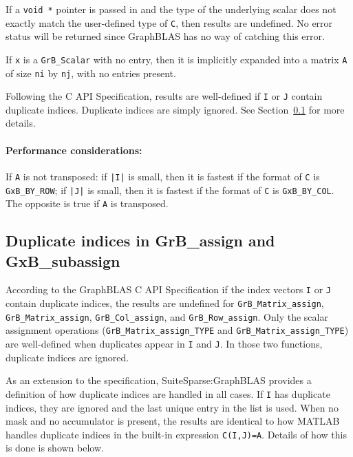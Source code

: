 \documentclass[12pt]{article}
\begin{document}
{If a \verb'void *' pointer is passed in and the type of the underlying scalar
does not exactly match the user-defined type of \verb'C', then results are
undefined.  No error status will be returned since GraphBLAS has no way of
catching this error.

If \verb'x' is a \verb'GrB_Scalar' with no entry, then it is implicitly
expanded into a matrix \verb'A' of size \verb'ni' by \verb'nj', with no entries
present.

Following the C API Specification, results are well-defined if \verb'I' or
\verb'J' contain duplicate indices.  Duplicate indices are simply ignored.  See
Section~\ref{duplicates} for more details.

\paragraph{\bf Performance considerations:} %
If \verb'A' is not transposed: if \verb'|I|' is small, then it is fastest if
the format of \verb'C' is \verb'GxB_BY_ROW'; if \verb'|J|' is small, then it is
fastest if the format of \verb'C' is \verb'GxB_BY_COL'.  The opposite is true
if \verb'A' is transposed.

\newpage
\subsection{Duplicate indices in {\sf GrB\_assign} and {\sf GxB\_subassign}}
\label{duplicates}

According to the GraphBLAS C API Specification if the index vectors \verb'I' or
\verb'J' contain duplicate indices, the results are undefined for
\verb'GrB_Matrix_assign', \verb'GrB_Matrix_assign', \verb'GrB_Col_assign', and
\verb'GrB_Row_assign'.  Only the scalar assignment operations
(\verb'GrB_Matrix_assign_TYPE' and \verb'GrB_Matrix_assign_TYPE') are
well-defined when duplicates appear in \verb'I' and \verb'J'.  In those two
functions, duplicate indices are ignored.

As an extension to the specification, SuiteSparse:GraphBLAS provides a
definition of how duplicate indices are handled in all cases.  If \verb'I' has
duplicate indices, they are ignored and the last unique entry in the list is
used.  When no mask and no accumulator is present, the results are identical to
how MATLAB handles duplicate indices in the built-in expression
\verb'C(I,J)=A'.  Details of how this is done is shown below.

}
\end{document}
